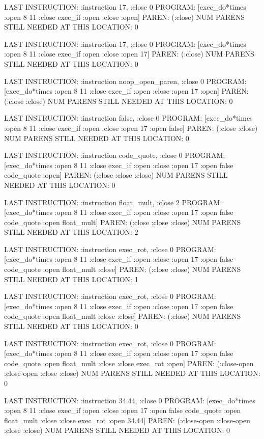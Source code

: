 LAST INSTRUCTION: {:instruction 17, :close 0}
PROGRAM: [exec\_do*times :open 8 11 :close exec\_if :open :close :open]
PAREN: (:close)
NUM PARENS STILL NEEDED AT THIS LOCATION: 0

LAST INSTRUCTION: {:instruction 17, :close 0}
PROGRAM: [exec\_do*times :open 8 11 :close exec\_if :open :close :open 17]
PAREN: (:close)
NUM PARENS STILL NEEDED AT THIS LOCATION: 0

LAST INSTRUCTION: {:instruction noop\_open\_paren, :close 0}
PROGRAM: [exec\_do*times :open 8 11 :close exec\_if :open :close :open 17 :open]
PAREN: (:close :close)
NUM PARENS STILL NEEDED AT THIS LOCATION: 0

LAST INSTRUCTION: {:instruction false, :close 0}
PROGRAM: [exec\_do*times :open 8 11 :close exec\_if :open :close :open 17 :open false]
PAREN: (:close :close)
NUM PARENS STILL NEEDED AT THIS LOCATION: 0

LAST INSTRUCTION: {:instruction code\_quote, :close 0}
PROGRAM: [exec\_do*times :open 8 11 :close exec\_if :open :close :open 17 :open false code\_quote :open]
PAREN: (:close :close :close)
NUM PARENS STILL NEEDED AT THIS LOCATION: 0

LAST INSTRUCTION: {:instruction float\_mult, :close 2}
PROGRAM: [exec\_do*times :open 8 11 :close exec\_if :open :close :open 17 :open false code\_quote :open float\_mult]
PAREN: (:close :close :close)
NUM PARENS STILL NEEDED AT THIS LOCATION: 2

LAST INSTRUCTION: {:instruction exec\_rot, :close 0}
PROGRAM: [exec\_do*times :open 8 11 :close exec\_if :open :close :open 17 :open false code\_quote :open float\_mult :close]
PAREN: (:close :close)
NUM PARENS STILL NEEDED AT THIS LOCATION: 1

LAST INSTRUCTION: {:instruction exec\_rot, :close 0}
PROGRAM: [exec\_do*times :open 8 11 :close exec\_if :open :close :open 17 :open false code\_quote :open float\_mult :close :close]
PAREN: (:close)
NUM PARENS STILL NEEDED AT THIS LOCATION: 0

LAST INSTRUCTION: {:instruction exec\_rot, :close 0}
PROGRAM: [exec\_do*times :open 8 11 :close exec\_if :open :close :open 17 :open false code\_quote :open float\_mult :close :close exec\_rot :open]
PAREN: (:close-open :close-open :close :close)
NUM PARENS STILL NEEDED AT THIS LOCATION: 0

LAST INSTRUCTION: {:instruction 34.44, :close 0}
PROGRAM: [exec\_do*times :open 8 11 :close exec\_if :open :close :open 17 :open false code\_quote :open float\_mult :close :close exec\_rot :open 34.44]
PAREN: (:close-open :close-open :close :close)
NUM PARENS STILL NEEDED AT THIS LOCATION: 0

